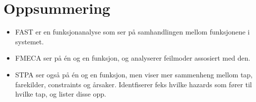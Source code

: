 \newpage
\section{Oppsummering}
\label{sec:oppsum}

\begin{itemize}
    \item FAST er en funksjonanalyse som ser på samhandlingen mellom funksjonene i systemet.
    \item FMECA ser på én og en funksjon, og analyserer feilmoder assosiert med den.
    \item STPA ser også på én og en funksjon, men viser mer sammenheng mellom tap, farekilder, constraints og årsaker. Identfiserer feks hvilke hazards som fører til hvilke tap, og lister disse opp. 
\end{itemize}
